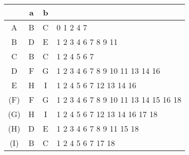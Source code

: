 \documentclass[11pt,a4paper]{report}
\begin{document}
\begin{tabular} {| c | c |c | l |}
\hline 
& a & b & \\ \hline
A & B & C & 0 1 2 4 7 \\ \hline
B & D & E & 1 2 3 4 6 7 8 9 11 \\ \hline
C & B & C & 1 2 4 5 6 7 \\ \hline
D & F & G & 1 2 3 4 6 7 8 9 10 11 13 14 16 \\ \hline
E & H & I & 1 2 4 5 6 7 12 13 14 16 \\ \hline
(F) & F & G & 1 2 3 4 6 7 8 9 10 11 13 14 15 16 18 \\ \hline
(G) & H & I & 1 2 4 5 6 7 12 13 14 16 17 18 \\ \hline
(H) & D & E & 1 2 3 4 6 7 8 9 11 15 18 \\ \hline
(I) & B & C & 1 2 4 5 6 7 17 18 \\ \hline
\end{tabular}
\end{document}
